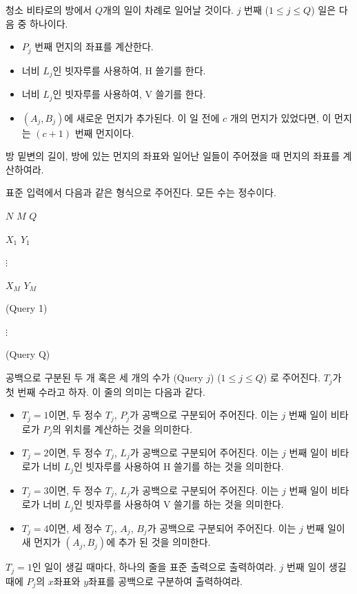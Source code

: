 \begin{problem}{청소}
	비타로의 방에서 $Q$개의 일이 차례로 일어날 것이다. $j$ 번째 ($1 \le j \le Q$) 일은 다음 중 하나이다.
	
	\begin{itemize}
		\item $P_j$ 번째 먼지의 좌표를 계산한다.
		\item 너비 $L_j$인 빗자루를 사용하여, H 쓸기를 한다.
		\item 너비 $L_j$인 빗자루를 사용하여, V 쓸기를 한다.
		\item $(A_j, B_j)$에 새로운 먼지가 추가된다. 이 일 전에 $c$ 개의 먼지가 있었다면, 이 먼지는 $(c+1)$ 번째 먼지이다.
	\end{itemize}
	
	방 밑변의 길이, 방에 있는 먼지의 좌표와 일어난 일들이 주어졌을 때 먼지의 좌표를 계산하여라.
	
	\InputFile
	
	표준 입력에서 다음과 같은 형식으로 주어진다. 모든 수는 정수이다.
	
	$N$ $M$ $Q$
	
	$X_1$ $Y_1$
	
	$\vdots$
	
	$X_M$ $Y_M$ 
	
	(Query 1)
	
	$\vdots$
	
	(Query Q)
	
	공백으로 구분된 두 개 혹은 세 개의 수가 (Query $j$) ($1 \le j \le Q$) 로 주어진다. $T_j$가 첫 번째 수라고 하자. 이 줄의 의미는 다음과 같다.
	
	\begin{itemize}
		\item $T_j=1$이면, 두 정수 $T_j$, $P_j$가 공백으로 구분되어 주어진다. 이는 $j$ 번째 일이 비타로가 $P_j$의 위치를 계산하는 것을 의미한다.
		\item $T_j=2$이면, 두 정수 $T_j$, $L_j$가 공백으로 구분되어 주어진다. 이는 $j$ 번째 일이 비타로가 너비 $L_j$인 빗자루를 사용하여 H 쓸기를 하는 것을 의미한다.
		\item $T_j=3$이면, 두 정수 $T_j$, $L_j$가 공백으로 구분되어 주어진다. 이는 $j$ 번째 일이 비타로가 너비 $L_j$인 빗자루를 사용하여 V 쓸기를 하는 것을 의미한다.
		\item $T_j=4$이면, 세 정수 $T_j$, $A_j$, $B_j$가 공백으로 구분되어 주어진다. 이는 $j$ 번째 일이 새 먼지가 $(A_j, B_j)$에 추가 된 것을 의미한다.
	\end{itemize}
	
	
	\OutputFile
	
	
	$T_j=1$인 일이 생길 때마다, 하나의 줄을 표준 출력으로 출력하여라. $j$ 번째 일이 생길 때에 $P_j$의 $x$좌표와 $y$좌표를 공백으로 구분하여 출력하여라.
	

\end{problem}
